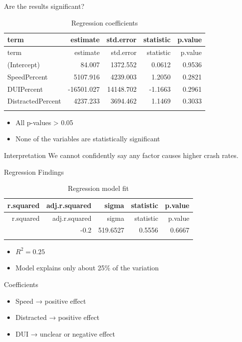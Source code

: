 \documentclass[
  ignorenonframetext,
  aspectratio=169]{beamer}
\providecommand{\tightlist}{%
  \setlength{\itemsep}{0pt}\setlength{\parskip}{0pt}}
\begin{document}
\begin{frame}{Are the results significant?}
\label{are-the-results-significant}
\begin{longtable}[]{@{}lrrrr@{}}
\caption{Regression coefficients}\tabularnewline
\toprule\noalign{}
term & estimate & std.error & statistic & p.value \\
\midrule\noalign{}
\endfirsthead
\toprule\noalign{}
term & estimate & std.error & statistic & p.value \\
\midrule\noalign{}
\endhead
(Intercept) & 84.007 & 1372.552 & 0.0612 & 0.9536 \\
SpeedPercent & 5107.916 & 4239.003 & 1.2050 & 0.2821 \\
DUIPercent & -16501.027 & 14148.702 & -1.1663 & 0.2961 \\
DistractedPercent & 4237.233 & 3694.462 & 1.1469 & 0.3033 \\
\bottomrule\noalign{}
\end{longtable}

\begin{itemize}
\tightlist
\item
  All p-values \textgreater{} 0.05
\item
  None of the variables are statistically significant
\end{itemize}

\begin{block}{Interpretation}
\label{interpretation}
We cannot confidently say any factor causes higher crash rates.
\end{block}
\end{frame}

\begin{frame}{Regression Findings}
\label{regression-findings}
\begin{longtable}[]{@{}rrrrr@{}}
\caption{Regression model fit}\tabularnewline
\toprule\noalign{}
r.squared & adj.r.squared & sigma & statistic & p.value \\
\midrule\noalign{}
\endfirsthead
\toprule\noalign{}
r.squared & adj.r.squared & sigma & statistic & p.value \\
\midrule\noalign{}
\endhead
0.25 & -0.2 & 519.6527 & 0.5556 & 0.6667 \\
\bottomrule\noalign{}
\end{longtable}

\begin{itemize}
\tightlist
\item
  \(R^2 = 0.25\)
\item
  Model explains only about 25\% of the variation
\end{itemize}

\begin{block}{Coefficients}
\label{coefficients}
\begin{itemize}
\tightlist
\item
  Speed → positive effect
\item
  Distracted → positive effect
\item
  DUI → unclear or negative effect
\end{itemize}
\end{block}
\end{frame}
\end{document}
